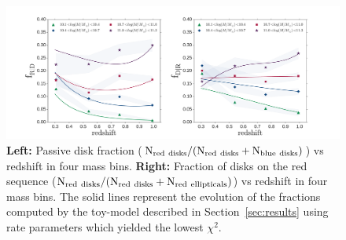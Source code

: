\documentclass[useAMS,usenatbib]{mn2e}
\begin{document}
\begin{figure}
\centering
\includegraphics[width=\textwidth,trim={0cm 0cm 2cm 1cm},clip]{figures/fractions_modeled.pdf}
\caption{\textbf{Left:} Passive disk fraction ($\rm N_{red~disks}/(N_{red~disks}+N_{blue~disks})$) vs redshift in four mass bins. \textbf{Right:} Fraction of disks on the red sequence ($\rm N_{red~disks}/(N_{red~disks}+N_{red~ellipticals})$) vs redshift in four mass bins. The solid lines represent the evolution of the fractions computed by the toy-model described in Section~\ref{sec:results} using rate parameters which yielded the lowest $\chi^2$.}
\label{fig:f_results}
\end{figure}
\end{document}
